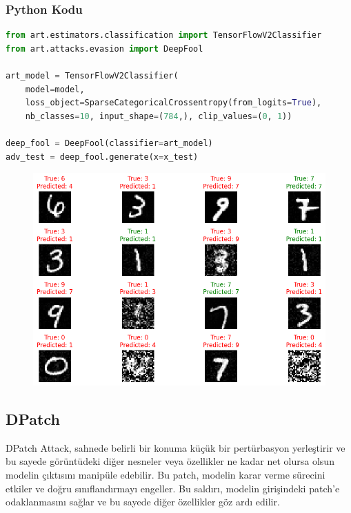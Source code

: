 \subsubsection{Python Kodu}

\begin{lstlisting}[language=Python]
from art.estimators.classification import TensorFlowV2Classifier
from art.attacks.evasion import DeepFool

art_model = TensorFlowV2Classifier(
    model=model, 
    loss_object=SparseCategoricalCrossentropy(from_logits=True), 
    nb_classes=10, input_shape=(784,), clip_values=(0, 1))

deep_fool = DeepFool(classifier=art_model)
adv_test = deep_fool.generate(x=x_test)
\end{lstlisting}

\newpage

\begin{figure}[h]
    \centering
    \includegraphics[width=1\textwidth]{images/deep_fool_attack_results.png}
    \caption{}
\end{figure}

\newpage

\subsection{DPatch}

DPatch Attack, sahnede belirli bir konuma küçük bir pertürbasyon yerleştirir ve bu sayede görüntüdeki diğer nesneler veya özellikler ne kadar net olursa olsun modelin çıktısını manipüle edebilir. Bu patch, modelin karar verme sürecini etkiler ve doğru sınıflandırmayı engeller. Bu saldırı, modelin girişindeki patch'e odaklanmasını sağlar ve bu sayede diğer özellikler göz ardı edilir.

